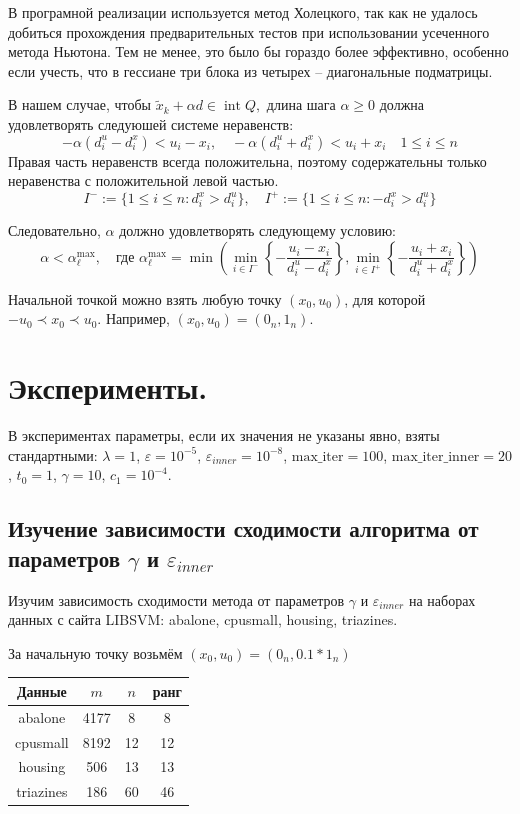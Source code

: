 \documentclass[11pt]{article}
\begin{document}
В програмной реализации используется метод Холецкого, так как не удалось добиться прохождения предварительных тестов при использовании усеченного метода Ньютона. Тем не менее, это было бы гораздо более эффективно, особенно если учесть, что в гессиане три блока из четырех -- диагональные подматрицы.

В нашем случае, чтобы $\tilde{x}_{k}+\alpha d \in \operatorname{int} Q,$ длина шага $\alpha \geq 0$ должна удовлетворять следуюшей системе неравенств:
$$
-\alpha(d^u_i - d^x_i) < u_i - x_i, \quad -\alpha(d^u_i + d^x_i) < u_i + x_i \quad 1 \leq i \leq n
$$
Правая часть неравенств всегда положительна, поэтому содержательны только неравенства с положительной левой частью.
$$
I^-:=\{1 \leq i \leq n: d_i^x > d_i^u\}, \quad I^+:=\{1 \leq i \leq n: -d_i^x > d_i^u\}
$$

Следовательно, $\alpha$ должно удовлетворять следующему условию:
$$
\alpha<\alpha_{\ell}^{\max }, \quad \text{где }  \alpha_{\ell}^{\max } = 
\min
\left( 
\min_{i \in I^-} \left\{-\frac{u_i - x_i}{d_i^u- d^x_i}\right\}, \min_{i \in I^+}\left\{-\frac{u_i + x_i}{d_i^u + d^x_i}  \right\} 
\right)
$$

Начальной точкой можно взять любую точку $(x_0, u_0)$, для которой  $-u_0 \prec x_0 \prec u_0$. Например,  $(x_0, u_0) = (0_n, 1_n)$.

\section{Эксперименты.}

В экспериментах параметры, если их значения не указаны явно, взяты стандартными:
$\lambda = 1$, $\varepsilon = 10^{-5}$,  $\varepsilon_{inner} = 10^{-8}$,
$\text{max\_iter}=100$, $\text{max\_iter\_inner}=20$, $t_0=1$, $\gamma=10$, $c_1=10^{-4}$.

\subsection{Изучение зависимости сходимости алгоритма от параметров $\gamma$ и $\varepsilon_{inner}$}

Изучим зависимость сходимости метода от параметров $\gamma$ и $\varepsilon_{inner}$ на наборах данных с сайта LIBSVM: abalone, cpusmall, housing, triazines.

За начальную точку возьмём $(x_0, u_0) = (0_n, 0.1 * 1_n)$

\begin{center}
\begin{tabular}{|c|c|c|c|} 
 \hline
 Данные & $m$ & $n$ & ранг \\ [0.5ex] 
 \hline\hline
 abalone & 4177 & 8 & 8\\ 
 \hline
 cpusmall & 8192 & 12 & 12\\ 
 \hline
housing & 506 & 13 & 13\\ 
 \hline
triazines & 186 & 60 & 46\\ 
 \hline
\end{tabular}
\end{center}
\end{document}
